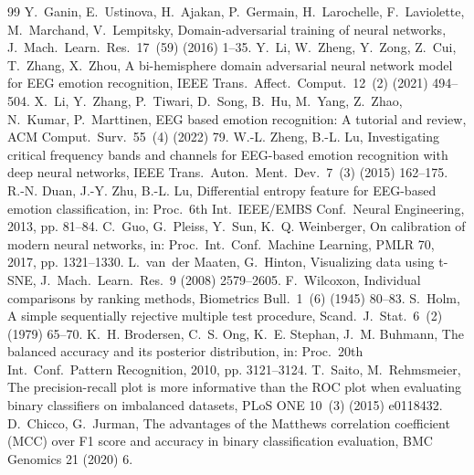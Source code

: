 \documentclass[a4paper,fleqn]{cas-sc}
\begin{document}
\begin{thebibliography}{99}
 Y.~Ganin, E.~Ustinova, H.~Ajakan, P.~Germain, H.~Larochelle, F.~Laviolette, M.~Marchand, V.~Lempitsky, Domain-adversarial training of neural networks, J.\ Mach.\ Learn.\ Res.\ 17~(59) (2016) 1--35.
 Y.~Li, W.~Zheng, Y.~Zong, Z.~Cui, T.~Zhang, X.~Zhou, A bi-hemisphere domain adversarial neural network model for EEG emotion recognition, IEEE Trans.\ Affect.\ Comput.\ 12~(2) (2021) 494--504.
 X.~Li, Y.~Zhang, P.~Tiwari, D.~Song, B.~Hu, M.~Yang, Z.~Zhao, N.~Kumar, P.~Marttinen, EEG based emotion recognition: A tutorial and review, ACM Comput.\ Surv.\ 55~(4) (2022) 79.
 W.-L. Zheng, B.-L. Lu, Investigating critical frequency bands and channels for EEG-based emotion recognition with deep neural networks, IEEE Trans.\ Auton.\ Ment.\ Dev.\ 7~(3) (2015) 162--175.
 R.-N. Duan, J.-Y. Zhu, B.-L. Lu, Differential entropy feature for EEG-based emotion classification, in: Proc.\ 6th Int.\ IEEE/EMBS Conf.\ Neural Engineering, 2013, pp. 81--84.
 C.~Guo, G.~Pleiss, Y.~Sun, K.~Q. Weinberger, On calibration of modern neural networks, in: Proc.\ Int.\ Conf.\ Machine Learning, PMLR 70, 2017, pp. 1321--1330.
 L.~van~der Maaten, G.~Hinton, Visualizing data using t-SNE, J.\ Mach.\ Learn.\ Res.\ 9 (2008) 2579--2605.
 F.~Wilcoxon, Individual comparisons by ranking methods, Biometrics Bull.\ 1~(6) (1945) 80--83.
 S.~Holm, A simple sequentially rejective multiple test procedure, Scand.\ J.\ Stat.\ 6~(2) (1979) 65--70.
 K.~H. Brodersen, C.~S. Ong, K.~E. Stephan, J.~M. Buhmann, The balanced accuracy and its posterior distribution, in: Proc.\ 20th Int.\ Conf.\ Pattern Recognition, 2010, pp. 3121--3124.
 T.~Saito, M.~Rehmsmeier, The precision-recall plot is more informative than the ROC plot when evaluating binary classifiers on imbalanced datasets, PLoS ONE 10~(3) (2015) e0118432.
 D.~Chicco, G.~Jurman, The advantages of the Matthews correlation coefficient (MCC) over F1 score and accuracy in binary classification evaluation, BMC Genomics 21 (2020) 6.
\end{thebibliography}

\printcredits
\end{document}
